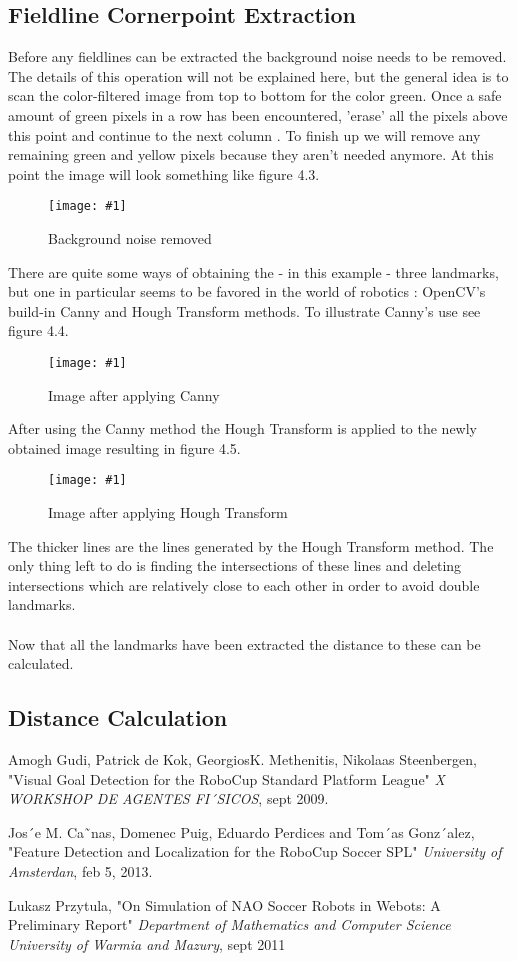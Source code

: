 \documentclass[twocolumn]{article}
\numberwithin{figure}{section}
\newcommand{\dkepic}[2]{ %
	\begin{figure}[H] %
	\texttt{[image: \#1]}
	\caption{#2}
	\label{#1}
	\end{figure}
}
\begin{document}
\subsection{Fieldline Cornerpoint Extraction}
Before any fieldlines can be extracted the background noise needs to be removed. The details of this operation will not be explained here, but the general idea is to scan the color-filtered image from top to bottom for the color green. Once a safe amount of green pixels in a row has been encountered, 'erase' all the pixels above this point and continue to the next column \cite{ref1}. To finish up we will remove any remaining green and yellow pixels because they aren't needed anymore. At this point the image will look something like figure 4.3.\\
\dkepic{figure_IP3}{Background noise removed}
There are quite some ways of obtaining the - in this example - three landmarks, but one in particular seems to be favored in the world of robotics \cite{ref2}\cite{ref3}: OpenCV's build-in Canny and Hough Transform methods. To illustrate Canny's use see figure 4.4.\\
\dkepic{figure_IP4}{Image after applying Canny}
After using the Canny method the Hough Transform is applied to the newly obtained image resulting in figure 4.5.\\
\dkepic{figure_IP5}{Image after applying Hough Transform}
The thicker lines are the lines generated by the Hough Transform method. The only thing left to do is finding the intersections of these lines and deleting intersections which are relatively close to each other in order to avoid double landmarks.\\ \\
Now that all the landmarks have been extracted the distance to these can be calculated.


\subsection{Distance Calculation}


\begin{thebibliography}{100} %
 
 Amogh Gudi, Patrick de Kok, GeorgiosK. Methenitis, Nikolaas Steenbergen, "Visual Goal Detection for the RoboCup Standard Platform League" \emph{X WORKSHOP DE AGENTES FI´SICOS}, sept 2009.

 Jos´e M. Ca˜nas, Domenec Puig, Eduardo Perdices and Tom´as Gonz´alez, "Feature Detection and Localization for the
RoboCup Soccer SPL" \emph{University of Amsterdan}, feb 5, 2013.

 Lukasz Przytula, "On Simulation of NAO Soccer Robots in Webots: A Preliminary Report" \emph{Department of Mathematics and Computer Science University of Warmia and Mazury}, sept 2011
 
\end{thebibliography} 
\end{document}
